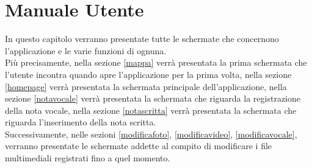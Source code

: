 \chapter{Manuale Utente}
\label{chapter3}
In questo capitolo verranno presentate tutte le schermate che concernono l'applicazione e le varie funzioni di ognuna.
\\Più precisamente, nella sezione \ref{mappa} verrà presentata la prima schermata che l'utente incontra quando apre l'applicazione per la prima volta, nella sezione \ref{homepage} verrà presentata la schermata principale dell'applicazione, nella sezione \ref{notavocale} verrà presentata la schermata che riguarda la registrazione della nota vocale, nella sezione \ref{notascritta} verrà presentata la schermata che riguarda l'inserimento della nota scritta.
\\Successivamente, nelle sezioni \ref{modificafoto}, \ref{modificavideo}, \ref{modificavocale}, verranno presentate le schermate addette al compito di modificare i file multimediali registrati fino a quel momento.

